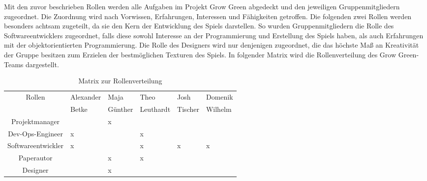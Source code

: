\vspace{5cm}

Mit den zuvor beschrieben Rollen werden alle Aufgaben im Projekt Grow Green abgedeckt und
den jeweiligen Gruppenmitgliedern zugeordnet. 
Die Zuordnung wird nach Vorwissen, Erfahrungen, Interessen und Fähigkeiten getroffen. 
Die folgenden zwei Rollen werden besonders achtsam zugeteilt, da sie den Kern der Entwicklung des Spiels darstellen.
So wurden Gruppenmitgliedern die Rolle des Softwareentwicklers zugeordnet, falls diese sowohl Interesse
an der Programmierung und Erstellung des Spiels haben, als auch Erfahrungen mit der 
objektorientierten Programmierung.
Die Rolle des Designers wird nur denjenigen zugeordnet, die das höchste Maß an Kreativität der Gruppe besitzen
zum Erzielen der bestmöglichen Texturen des Spiels.
In folgender Matrix wird die Rollenverteilung des Grow Green-Teams dargestellt.


\begin{table}[H]
    \begin{center}
        \label{tab:rollenverteilung}
        \begin{tabular}{c|p{2cm}|p{2cm}|p{2cm}|p{2cm}|p{2cm}}
            Rollen 
            & Alexander 
            & Maja 
            & Theo 
            & Josh 
            & Domenik \\
            & Betke
            & Günther
            & Leuthardt
            & Tischer
            & Wilhelm \\
            \hline
            Projektmanager &  & x &  &  &  \\
            Dev-Ops-Engineer & x &  & x &  &  \\
            Softwareentwickler & x &  & x & x & x \\
            Paperautor &  & x & x &  &  \\
            Designer &  & x &  &  &  \\
        \end{tabular}
        \caption{Matrix zur Rollenverteilung}
    \end{center}
\end{table}